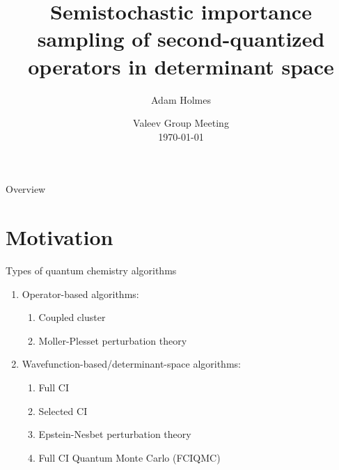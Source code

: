 \documentclass[amsmath]{beamer}
\begin{document}
	\title[Semistochastic importance sampling]{Semistochastic importance sampling of second-quantized operators in determinant space}
	\author[A. Holmes]{Adam Holmes}
	\date{Valeev Group Meeting\\\today} 
	
	\frame{\titlepage} 
	
	\begin{frame}{Overview}
		\tableofcontents[hideallsubsections]
	\end{frame}

\section{Motivation}
\begin{frame}{Types of quantum chemistry algorithms}
	\begin{enumerate}
		\item Operator-based algorithms:
		\begin{enumerate}
			\item Coupled cluster
			\item Moller-Plesset perturbation theory
			\linebreak
		\end{enumerate}
		\item Wavefunction-based/determinant-space algorithms:
		\begin{enumerate}
			\item Full CI
			\item Selected CI
			\item Epstein-Nesbet perturbation theory
			\item Full CI Quantum Monte Carlo (FCIQMC)
		\end{enumerate}
	\end{enumerate}
\end{frame}

\end{document}
